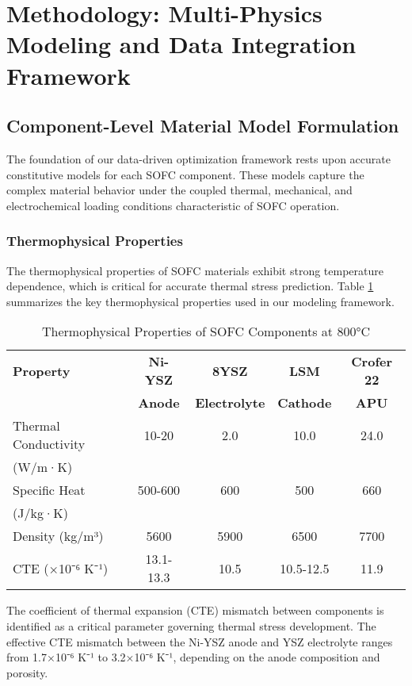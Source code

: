 \documentclass[conference]{IEEEtran}
\begin{document}
\section{Methodology: Multi-Physics Modeling and Data Integration Framework}

\subsection{Component-Level Material Model Formulation}

The foundation of our data-driven optimization framework rests upon accurate constitutive models for each SOFC component. These models capture the complex material behavior under the coupled thermal, mechanical, and electrochemical loading conditions characteristic of SOFC operation.

\subsubsection{Thermophysical Properties}

The thermophysical properties of SOFC materials exhibit strong temperature dependence, which is critical for accurate thermal stress prediction. Table \ref{tab:thermophysical} summarizes the key thermophysical properties used in our modeling framework.

\begin{table}[H]
\centering
\caption{Thermophysical Properties of SOFC Components at 800°C}
\label{tab:thermophysical}
\begin{tabular}{@{}lcccc@{}}
\toprule
\textbf{Property} & \textbf{Ni-YSZ} & \textbf{8YSZ} & \textbf{LSM} & \textbf{Crofer 22} \\
 & \textbf{Anode} & \textbf{Electrolyte} & \textbf{Cathode} & \textbf{APU} \\
\midrule
Thermal Conductivity & 10-20 & 2.0 & 10.0 & 24.0 \\
(W/m·K) & & & & \\
Specific Heat & 500-600 & 600 & 500 & 660 \\
(J/kg·K) & & & & \\
Density (kg/m³) & 5600 & 5900 & 6500 & 7700 \\
CTE (×10⁻⁶ K⁻¹) & 13.1-13.3 & 10.5 & 10.5-12.5 & 11.9 \\
\bottomrule
\end{tabular}
\end{table}

The coefficient of thermal expansion (CTE) mismatch between components is identified as a critical parameter governing thermal stress development. The effective CTE mismatch between the Ni-YSZ anode and YSZ electrolyte ranges from 1.7×10⁻⁶ K⁻¹ to 3.2×10⁻⁶ K⁻¹, depending on the anode composition and porosity.
\end{document}
